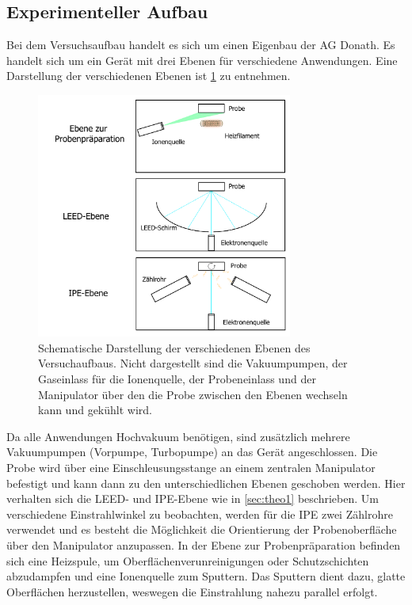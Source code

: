 \subsection{Experimenteller Aufbau}

Bei dem Versuchsaufbau handelt es sich um einen Eigenbau der AG Donath.
Es handelt sich um ein Gerät mit drei Ebenen für verschiedene Anwendungen.
Eine Darstellung der verschiedenen Ebenen ist \cref{fig_ipe_setup} zu entnehmen.
\begin{figure}[!ht]
    \centering
    \includegraphics[width=0.75\textwidth]{img/setup1.png}
    \caption{Schematische Darstellung der verschiedenen Ebenen des Versuchaufbaus.
    Nicht dargestellt sind die Vakuumpumpen, der Gaseinlass für die Ionenquelle, der Probeneinlass und der Manipulator über den die Probe zwischen den Ebenen wechseln kann und gekühlt wird.} %
    \label{fig_ipe_setup}
\end{figure}
Da alle Anwendungen Hochvakuum benötigen, sind zusätzlich mehrere Vakuumpumpen (Vorpumpe, Turbopumpe) an das Gerät angeschlossen.
Die Probe wird über eine Einschleusungsstange an einem zentralen Manipulator befestigt und kann dann zu den unterschiedlichen Ebenen geschoben werden.
Hier verhalten sich die LEED- und IPE-Ebene wie in \cref{sec:theo1} beschrieben.
Um verschiedene Einstrahlwinkel zu beobachten, werden für die IPE zwei Zählrohre verwendet und es besteht die Möglichkeit die Orientierung der Probenoberfläche über den Manipulator anzupassen.
In der Ebene zur Probenpräparation befinden sich eine Heizspule, um Oberflächenverunreinigungen oder Schutzschichten abzudampfen und eine Ionenquelle zum Sputtern.
Das Sputtern dient dazu, glatte Oberflächen herzustellen, weswegen die Einstrahlung nahezu parallel erfolgt.

